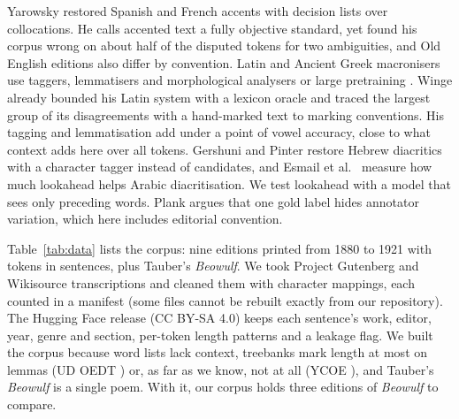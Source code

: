 \documentclass[11pt]{article}
\makeatletter
\renewcommand\section{\@startsection{section}{1}{\z@}{-2.5ex \@plus -.5ex \@minus -.2ex}{1.3ex \@plus .2ex}{\normalfont\Large\bfseries}}
\renewcommand\paragraph{\@startsection{paragraph}{4}{\z@}{1ex \@plus .5ex \@minus .2ex}{-1em}{\normalfont\normalsize\bfseries}}
\makeatother
\begin{document}
\paragraph{Related work.} Yarowsky \cite{yarowsky1994} restored Spanish and French accents with decision lists over collocations. He calls accented text a fully objective standard, yet found his corpus wrong on about half of the disputed tokens for two ambiguities, and Old English editions also differ by convention.
Latin \cite{winge2015} and Ancient Greek \cite{cleland2026} macronisers use taggers, lemmatisers and morphological
analysers or large pretraining \cite{cullhed2026}. Winge \cite{winge2015} already bounded his Latin system with a lexicon oracle and
traced the largest group of its disagreements with a hand-marked text to marking conventions. His tagging and lemmatisation add under a point of vowel accuracy, close to what context adds here over all tokens. Gershuni and Pinter
\cite{gershuni2022} restore Hebrew diacritics with a character tagger instead of candidates, and Esmail et al.\
\cite{esmail2022} measure how much lookahead helps Arabic diacritisation. We test lookahead with a model that sees only
preceding words. Plank \cite{plank2022} argues that one gold label hides annotator
variation, which here includes editorial convention.

\section{Data set}\label{sec:data}
Table~\ref{tab:data} lists the corpus: nine editions printed from 1880 to 1921 with \NCorpusTokens{} tokens in
\NPCorpusSentences{} sentences, plus Tauber's \textit{Beowulf}. We took Project Gutenberg and Wikisource
transcriptions \cite{zupitza1880,bright1913,bright1910,sweet1905,cook1921,bright1904,hargrove1902,harrison1883,wyatt1894} and cleaned them with character mappings, each counted in a manifest (some files cannot be rebuilt exactly from our repository). The Hugging Face release (CC BY-SA
4.0) keeps each sentence's work, editor, year, genre and section, per-token length patterns and a leakage flag.
We built the corpus because word lists lack context, treebanks mark length at most on lemmas (UD OEDT \cite{oedt}) or, as far as we know, not at all (YCOE \cite{ycoe2003}), and Tauber's \textit{Beowulf} is a single poem. With it, our corpus holds
three editions of \textit{Beowulf} to compare.

\begin{table}[t]
\centering\footnotesize
\caption{The corpus. PG: Project Gutenberg, WS: Wikisource. \% long: share of vowel letters marked long.}
\label{tab:data}
%
\end{table}
\end{document}
